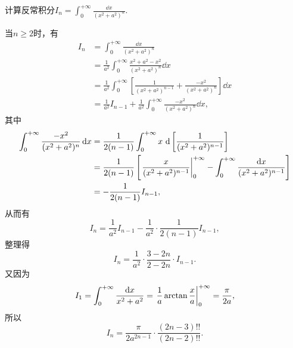 \begin{example}
计算反常积分\(I_n = \int_0^{+\infty} \frac{\dd{x}}{(x^2+a^2)^n}\).
\begin{solution}
当\(n\geq2\)时，有\begin{align*}
	I_n &= \int_0^{+\infty} \frac{\dd{x}}{(x^2+a^2)^n} \\
	&= \frac1{a^2} \int_0^{+\infty} \frac{x^2+a^2-x^2}{(x^2+a^2)^n} \dd{x} \\
	&= \frac1{a^2} \int_0^{+\infty} \left[
		\frac1{(x^2+a^2)^{n-1}}
		+ \frac{-x^2}{(x^2+a^2)^n}
	\right] \dd{x} \\
	&= \frac1{a^2} I_{n-1}
		+ \frac1{a^2} \int_0^{+\infty} \frac{-x^2}{(x^2+a^2)^n} \dd{x},
\end{align*}
其中\begin{align*}
	\int_0^{+\infty} \frac{-x^2}{(x^2+a^2)^n} \dd{x}
	&= \frac1{2(n-1)} \int_0^{+\infty} x ~ \dd\left[\frac1{(x^2+a^2)^{n-1}}\right] \\
	&= \frac1{2(n-1)} \left[
		\eval{\frac{x}{(x^2+a^2)^{n-1}}}_0^{+\infty}
		- \int_0^{+\infty} \frac{\dd{x}}{(x^2+a^2)^{n-1}}
	\right] \\
	&= -\frac1{2(n-1)} I_{n-1},
\end{align*}
从而有\[
	I_n = \frac1{a^2} I_{n-1} - \frac1{a^2} \cdot \frac1{2(n-1)} I_{n-1},
\]
整理得\[
	I_n = \frac1{a^2} \cdot \frac{3-2n}{2-2n} \cdot I_{n-1}.
\]
又因为\[
	I_1 = \int_0^{+\infty} \frac{\dd{x}}{x^2+a^2}
	= \eval{\frac1a \arctan\frac{x}{a}}_0^{+\infty}
	= \frac\pi{2a},
\]
所以\[
	I_n = \frac\pi{2a^{2n-1}} \cdot \frac{(2n-3)!!}{(2n-2)!!}.
\]
\end{solution}
\end{example}


